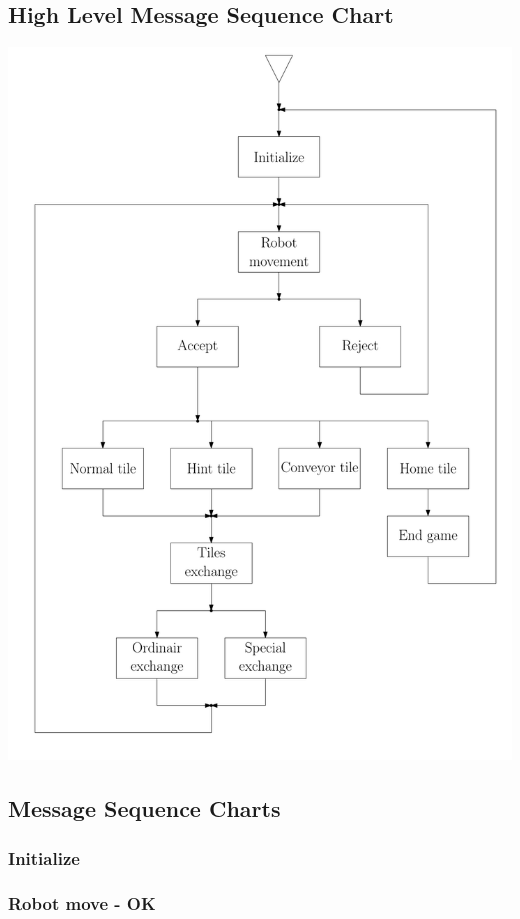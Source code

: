 \subsection{High Level Message Sequence Chart}
	\includegraphics[width=\linewidth,bb=0 0 680 1000]{MSC-files/HMSC.pdf}
	
\subsection{Message Sequence Charts}
    \subsubsection{Initialize}
    
    
	\subsubsection{Robot move - OK}
		
	
